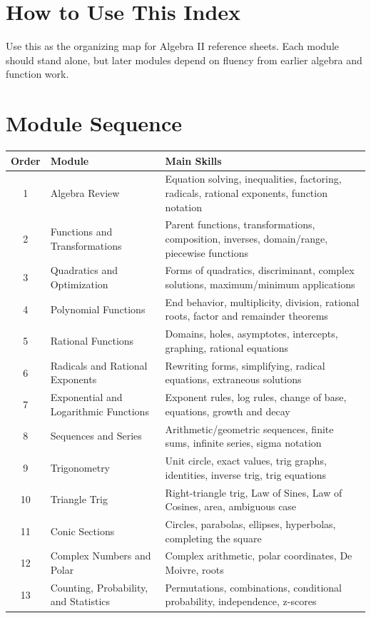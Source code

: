 \documentclass[11pt]{article}
\begin{document}

\section*{How to Use This Index}
Use this as the organizing map for Algebra II reference sheets. Each module should stand alone, but later modules depend on fluency from earlier algebra and function work.

\section*{Module Sequence}
\begin{center}
\begin{tabular}{clp{3.55in}}
\toprule
Order & Module & Main Skills \\
\midrule
1 & Algebra Review & Equation solving, inequalities, factoring, radicals, rational exponents, function notation \\
2 & Functions and Transformations & Parent functions, transformations, composition, inverses, domain/range, piecewise functions \\
3 & Quadratics and Optimization & Forms of quadratics, discriminant, complex solutions, maximum/minimum applications \\
4 & Polynomial Functions & End behavior, multiplicity, division, rational roots, factor and remainder theorems \\
5 & Rational Functions & Domains, holes, asymptotes, intercepts, graphing, rational equations \\
6 & Radicals and Rational Exponents & Rewriting forms, simplifying, radical equations, extraneous solutions \\
7 & Exponential and Logarithmic Functions & Exponent rules, log rules, change of base, equations, growth and decay \\
8 & Sequences and Series & Arithmetic/geometric sequences, finite sums, infinite series, sigma notation \\
9 & Trigonometry & Unit circle, exact values, trig graphs, identities, inverse trig, trig equations \\
10 & Triangle Trig & Right-triangle trig, Law of Sines, Law of Cosines, area, ambiguous case \\
11 & Conic Sections & Circles, parabolas, ellipses, hyperbolas, completing the square \\
12 & Complex Numbers and Polar & Complex arithmetic, polar coordinates, De Moivre, roots \\
13 & Counting, Probability, and Statistics & Permutations, combinations, conditional probability, independence, z-scores \\
\bottomrule
\end{tabular}
\end{center}
\end{document}
